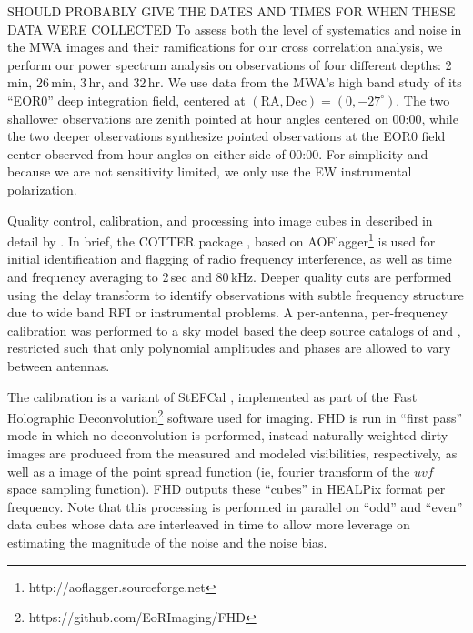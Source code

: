 \documentclass{emulateapj}
\begin{document}
SHOULD PROBABLY GIVE THE DATES AND TIMES FOR WHEN THESE DATA WERE COLLECTED
To assess both the level of systematics and noise in the MWA images and their ramifications for our cross correlation analysis, we perform our power spectrum analysis on observations of four different depths: 2\,min, 26\,min, 3\,hr, and 32\,hr. We use data from the MWA's high band study of its ``EOR0'' deep integration field, centered at $(\text{RA}, \text{Dec})=(0,-27^\circ)$. The two shallower observations are zenith pointed at hour angles centered on 00:00, while the two deeper observations synthesize pointed observations at the EOR0 field center observed from hour angles on either side of 00:00. For simplicity and because we are not sensitivity limited, we only use the EW instrumental polarization.

Quality control, calibration, and processing into image cubes in described in detail by \citet{beardsley16}. In brief, the COTTER package \citep{AndreMWARFI}, based on AOFlagger\footnote{http://aoflagger.sourceforge.net} \citep{aoflagger} is used for initial identification and flagging of radio frequency interference, as well as time and frequency averaging to 2\,sec and 80\,kHz. Deeper quality cuts are performed using the delay transform \citep{parsons12b} to identify observations with subtle frequency structure due to wide band RFI or instrumental problems. A per-antenna, per-frequency calibration was performed to a sky model based the deep source catalogs of \citet{PattiCatalog1} and \citet{mwacs}, restricted such that only polynomial amplitudes and phases are allowed to vary between antennas. 

The calibration is a variant of StEFCal \citep{stefcal}, implemented as part of the Fast Holographic Deconvolution\footnote{https://github.com/EoRImaging/FHD} \citep{fhd} software used for imaging. FHD is run in ``first pass'' mode in which no deconvolution is performed, instead naturally weighted dirty images are produced from the measured and modeled visibilities, respectively, as well as a image of the point spread function (ie, fourier transform of the $uvf$ space sampling function). FHD outputs these ``cubes'' in HEALPix format per frequency. Note that this processing is performed in parallel on ``odd'' and ``even'' data cubes whose data are interleaved in time to allow more leverage on estimating the magnitude of the noise and the noise bias.
\end{document}
